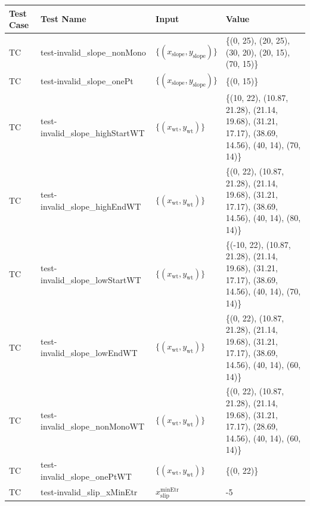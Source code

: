 \documentclass[12pt, titlepage]{article}
\newcounter{testnum} %
\begin{document}
\begin{longtable}{  l  p{5cm}  l  p{5cm}  }
	\hline
	\textbf{Test Case} & \textbf{Test Name} & \textbf{Input} & \textbf{Value} \\
	\hline
	TC{testnum}\thetestnum \label{TC_InvalidSlopeNonMonotonic} & 
	test-invalid\_slope\_nonMono & 
	$\{\left(x_\text{slope},y_\text{slope}\right)\}$ & \{(0, 25), (20, 25), 
	(30, 20), (20, 15), (70, 15)\}\\ 
	\hline
	TC{testnum}\thetestnum \label{TC_InvalidSlopeOnePt} & 
	test-invalid\_slope\_onePt & 
	$\{\left(x_\text{slope},y_\text{slope}\right)\}$ & \{(0, 15)\}\\ 
	\hline
	TC{testnum}\thetestnum \label{TC_InvalidSlopeHighStartWT} & 
	test-invalid\_slope\_highStartWT & 
	$\{\left(x_\text{wt},y_\text{wt}\right)\}$ & \{(10, 22), (10.87, 21.28), 
	(21.14, 
	19.68), (31.21, 17.17), (38.69, 14.56), (40, 14), (70, 14)\}\\ 
	\hline
	TC{testnum}\thetestnum \label{TC_InvalidSlopeHighEndWT} & 
	test-invalid\_slope\_highEndWT & 
	$\{\left(x_\text{wt},y_\text{wt}\right)\}$ & \{(0, 22), (10.87, 21.28), 
	(21.14, 
	19.68), (31.21, 17.17), (38.69, 14.56), (40, 14), (80, 14)\}\\ 
	\hline
	TC{testnum}\thetestnum \label{TC_InvalidSlopeLowStartWT} & 
	test-invalid\_slope\_lowStartWT & 
	$\{\left(x_\text{wt},y_\text{wt}\right)\}$ & \{(-10, 22), (10.87, 21.28), 
	(21.14, 
	19.68), (31.21, 17.17), (38.69, 14.56), (40, 14), (70, 14)\}\\ 
	\hline
	TC{testnum}\thetestnum \label{TC_InvalidSlopeLowEndWT} & 
	test-invalid\_slope\_lowEndWT & 
	$\{\left(x_\text{wt},y_\text{wt}\right)\}$ & \{(0, 22), (10.87, 21.28), 
	(21.14, 
	19.68), (31.21, 17.17), (38.69, 14.56), (40, 14), (60, 14)\}\\ 
	\hline
	TC{testnum}\thetestnum \label{TC_InvalidSlopeNonMonoWT} & 
	test-invalid\_slope\_nonMonoWT & 
	$\{\left(x_\text{wt},y_\text{wt}\right)\}$ & \{(0, 22), (10.87, 
	21.28), (21.14, 19.68), (31.21, 17.17), (28.69, 14.56), (40, 14), (60, 
	14)\}\\ 
	\hline
	TC{testnum}\thetestnum \label{TC_InvalidSlopeOnePtWT} & 
	test-invalid\_slope\_onePtWT & 
	$\{\left(x_\text{wt},y_\text{wt}\right)\}$ & \{(0, 22)\}\\ 
	\hline
	TC{testnum}\thetestnum \label{TC_InvalidSlipXMinEtr} & 
	test-invalid\_slip\_xMinEtr & ${x_\text{slip}^\text{minEtr}}$ & -5\\ 

\end{longtable}
\end{document}
